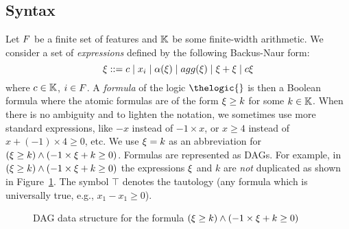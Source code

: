 \subsection{Syntax}
Let $F$ be a finite set of features and $\mathbb K$ be some finite-width arithmetic. We consider a set of \emph{expressions} defined by the following Backus-Naur form:
%
$$\expression ::= c \mid x_i \mid \activationfunction (\expression) \mid \agreggationfunction (\expression) \mid %
\expression + \expression \mid c\expression$$
%
where $c \in \mathbb K$, $i \in F$.
%
%
%
A \emph{formula} of the logic $\thelogic{}$ is then a Boolean formula where the atomic formulas are of the form $\xi \geq k$ for some $k \in \mathbb K$. 
When there is no ambiguity and to lighten the notation, we sometimes use more standard expressions, like $-x$ instead of $-1 \times x$, or $x \geq 4$ instead of $x + (-1) \times 4 \geq 0$, etc. We use $\xi = k$  as an abbreviation for
$(\xi \geq k) \land (-1 \times \xi + k \geq 0)$.
Formulas are represented as DAGs.
%
For example, in 
$(\xi \geq k) \land (-1 \times \xi + k \geq 0)$
the expressions $\xi$ and $k$ are \emph{not} duplicated as shown in Figure~\ref{figure:dag}.
The symbol $\top$ denotes the tautology (any formula which is universally true, e.g., $x_1 - x_1 \geq 0$).
\begin{figure}
    \centering
  
    \caption{DAG data structure for the formula 
    $(\xi \geq k) \land (-1 \times \xi + k \geq 0)$}
    \label{figure:dag}
\end{figure}




